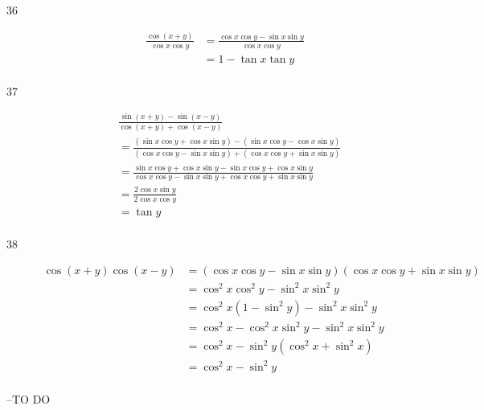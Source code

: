 \documentclass{exam}
\begin{document}
\begin{description}
      \item[36] 
        \begin{align*}
          \frac{\cos(x + y)}{\cos x \cos y} & = \frac{\cos x \cos y - \sin x \sin y}{\cos x \cos y} \\
                                            & = 1 - \tan x \tan y \\
        \end{align*}

      \item[37] 
        \begin{align*}
          & \frac{\sin(x + y) - \sin(x - y)}{\cos(x + y) + \cos(x - y)} \\
          & = \frac{(\sin x \cos y + \cos x \sin y) - (\sin x \cos y - \cos x \sin y)}{(\cos x \cos y - \sin x \sin y) + (\cos x \cos y + \sin x \sin y)} \\
          & = \frac{\sin x \cos y + \cos x \sin y - \sin x \cos y + \cos x \sin y}{\cos x \cos y - \sin x \sin y + \cos x \cos y + \sin x \sin y} \\
          & = \frac{2 \cos x \sin y}{2 \cos x \cos y} \\
          & = \tan y \\
        \end{align*}

      \item[38] 
        \begin{align*}
          \cos(x + y) \cos(x - y) & = ( \cos x \cos y - \sin x \sin y )( \cos x \cos y + \sin x \sin y ) \\
                                  & = \cos^2 x \cos^2 y - \sin^2 x \sin^2 y \\
                                  & = \cos^2 x \left( 1 - \sin^2 y \right) - \sin^2 x \sin^2 y \\
                                  & = \cos^2 x - \cos^2 x \sin^2 y  - \sin^2 x \sin^2 y \\
                                  & = \cos^2 x - \sin^2 y \left( \cos^2 x + \sin^2 x \right) \\
                                  & = \cos^2 x - \sin^2 y \\
        \end{align*}

    \end{description}

  \else
    \vspace{5 cm}

    \begin{quote}
      \begin{em}
      \end{em}
    \end{quote}
    \hspace{1 cm} --TO DO
  \fi
\end{document}
